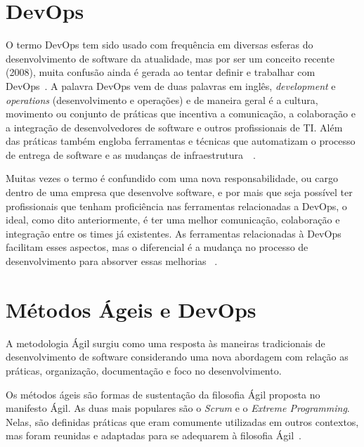 \section{DevOps}
\label{sec:devops}

O termo DevOps tem sido usado com frequência em diversas esferas do
desenvolvimento de software da atualidade, mas por ser um conceito recente
(2008), muita confusão ainda é gerada ao tentar definir e trabalhar com
DevOps~\cite{adambertram:2016}. A palavra DevOps vem de duas palavras em
inglês, \textit{development} e \textit{operations} (desenvolvimento e operações) e de maneira
geral é a cultura, movimento ou conjunto de práticas que incentiva
a comunicação, a colaboração e a integração de desenvolvedores de software
e outros profissionais de TI. Além das práticas também engloba ferramentas
e técnicas que automatizam o processo de entrega de software e as mudanças
de infraestrutura~\cite{loukides2012devops}~\cite{erich2014mapping}.

Muitas vezes o termo é confundido com uma nova responsabilidade, ou cargo
dentro de uma empresa que desenvolve software, e por mais que seja possível
ter profissionais que tenham proficiência nas ferramentas relacionadas a
DevOps, o ideal, como dito anteriormente, é ter uma melhor comunicação,
colaboração e integração entre os times já existentes. As ferramentas
relacionadas à DevOps facilitam esses aspectos, mas o diferencial é a
mudança no processo de desenvolvimento para absorver essas melhorias
~\cite{adambertram:2016}.


\section{Métodos Ágeis e DevOps}
\label{sec:agile-devops}

A metodologia Ágil surgiu como uma resposta às maneiras tradicionais de desenvolvimento
de software considerando uma nova abordagem com relação as práticas, organização,
documentação e foco no desenvolvimento.~\cite{agilemetorg:2016}

Os métodos ágeis são formas de sustentação da filosofia Ágil proposta no manifesto
Ágil\cite{fowler:2001}. As duas mais populares são o \textit{Scrum} e o \textit{Extreme Programming}. Nelas,
são definidas práticas que eram comumente utilizadas em outros contextos,
mas foram reunidas e adaptadas para se adequarem à filosofia Ágil~\cite{shore:2007}.

